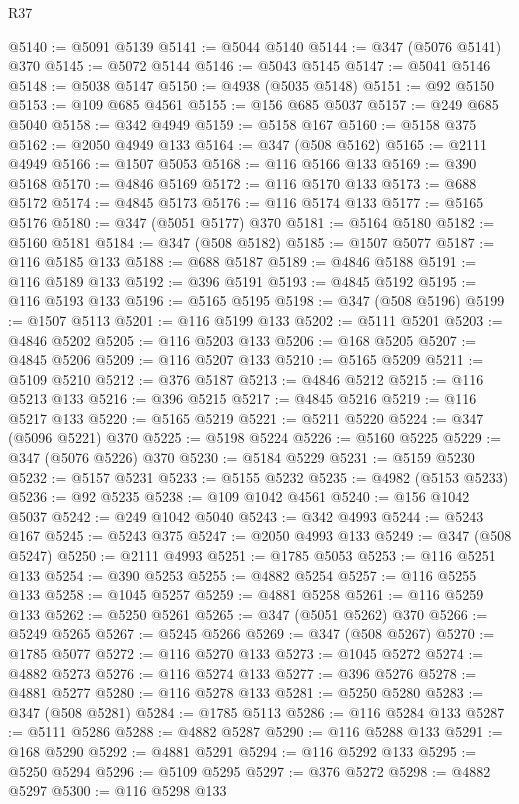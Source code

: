 \begin{lexlean}{R37}
\begin{coremodule}
@5140 := @5091 @5139
@5141 := @5044 @5140
@5144 := @347 (@5076 @5141) @370
@5145 := @5072 @5144
@5146 := @5043 @5145
@5147 := @5041 @5146
@5148 := @5038 @5147
@5150 := @4938 (@5035 @5148)
@5151 := @92 @5150
@5153 := @109 @685 @4561
@5155 := @156 @685 @5037
@5157 := @249 @685 @5040
@5158 := @342 @4949
@5159 := @5158 @167
@5160 := @5158 @375
@5162 := @2050 @4949 @133
@5164 := @347 (@508 @5162)
@5165 := @2111 @4949
@5166 := @1507 @5053
@5168 := @116 @5166 @133
@5169 := @390 @5168
@5170 := @4846 @5169
@5172 := @116 @5170 @133
@5173 := @688 @5172
@5174 := @4845 @5173
@5176 := @116 @5174 @133
@5177 := @5165 @5176
@5180 := @347 (@5051 @5177) @370
@5181 := @5164 @5180
@5182 := @5160 @5181
@5184 := @347 (@508 @5182)
@5185 := @1507 @5077
@5187 := @116 @5185 @133
@5188 := @688 @5187
@5189 := @4846 @5188
@5191 := @116 @5189 @133
@5192 := @396 @5191
@5193 := @4845 @5192
@5195 := @116 @5193 @133
@5196 := @5165 @5195
@5198 := @347 (@508 @5196)
@5199 := @1507 @5113
@5201 := @116 @5199 @133
@5202 := @5111 @5201
@5203 := @4846 @5202
@5205 := @116 @5203 @133
@5206 := @168 @5205
@5207 := @4845 @5206
@5209 := @116 @5207 @133
@5210 := @5165 @5209
@5211 := @5109 @5210
@5212 := @376 @5187
@5213 := @4846 @5212
@5215 := @116 @5213 @133
@5216 := @396 @5215
@5217 := @4845 @5216
@5219 := @116 @5217 @133
@5220 := @5165 @5219
@5221 := @5211 @5220
@5224 := @347 (@5096 @5221) @370
@5225 := @5198 @5224
@5226 := @5160 @5225
@5229 := @347 (@5076 @5226) @370
@5230 := @5184 @5229
@5231 := @5159 @5230
@5232 := @5157 @5231
@5233 := @5155 @5232
@5235 := @4982 (@5153 @5233)
@5236 := @92 @5235
@5238 := @109 @1042 @4561
@5240 := @156 @1042 @5037
@5242 := @249 @1042 @5040
@5243 := @342 @4993
@5244 := @5243 @167
@5245 := @5243 @375
@5247 := @2050 @4993 @133
@5249 := @347 (@508 @5247)
@5250 := @2111 @4993
@5251 := @1785 @5053
@5253 := @116 @5251 @133
@5254 := @390 @5253
@5255 := @4882 @5254
@5257 := @116 @5255 @133
@5258 := @1045 @5257
@5259 := @4881 @5258
@5261 := @116 @5259 @133
@5262 := @5250 @5261
@5265 := @347 (@5051 @5262) @370
@5266 := @5249 @5265
@5267 := @5245 @5266
@5269 := @347 (@508 @5267)
@5270 := @1785 @5077
@5272 := @116 @5270 @133
@5273 := @1045 @5272
@5274 := @4882 @5273
@5276 := @116 @5274 @133
@5277 := @396 @5276
@5278 := @4881 @5277
@5280 := @116 @5278 @133
@5281 := @5250 @5280
@5283 := @347 (@508 @5281)
@5284 := @1785 @5113
@5286 := @116 @5284 @133
@5287 := @5111 @5286
@5288 := @4882 @5287
@5290 := @116 @5288 @133
@5291 := @168 @5290
@5292 := @4881 @5291
@5294 := @116 @5292 @133
@5295 := @5250 @5294
@5296 := @5109 @5295
@5297 := @376 @5272
@5298 := @4882 @5297
@5300 := @116 @5298 @133

\end{coremodule}
\end{lexlean}
